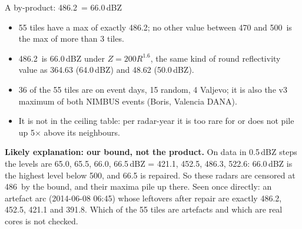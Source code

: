 \begin{frame}{A by-product: 486.2\mmh\ = 66.0\,dBZ}
  \small
  \begin{itemize}
    \item 55 tiles have a max of exactly 486.2\mmh; no other value between 470 and 500\mmh\
      is the max of more than 3 tiles.
    \item 486.2\mmh\ is 66.0\,dBZ under $Z = 200R^{1.6}$, the same kind of round reflectivity
      value as 364.63 (64.0\,dBZ) and 48.62 (50.0\,dBZ).
    \item 36 of the 55 tiles are on event days, 15 random, 4 Valjevo; it is also the v3 maximum
      of both NIMBUS events (Boris, Valencia DANA).
    \item It is not in the ceiling table: per radar-year it is too rare for
      \code{min\_count: 50} or does not pile up 5$\times$ above its neighbours.
  \end{itemize}
  \vspace{2mm}
  \textbf{Likely explanation: our bound, not the product.} On data in 0.5\,dBZ steps the levels
  are 65.0, 65.5, 66.0, 66.5\,dBZ = 421.1, 452.5, 486.3, 522.6\mmh: 66.0\,dBZ is the highest level
  below 500\mmh, and 66.5 is repaired. So these radars are censored at 486\mmh\ by the bound,
  and their maxima pile up there. Seen once directly: an artefact arc (2014-06-08 06:45) whose
  leftovers after repair are exactly 486.2, 452.5, 421.1 and 391.8\mmh. Which of the 55 tiles
  are artefacts and which are real cores is not checked.
\end{frame}
